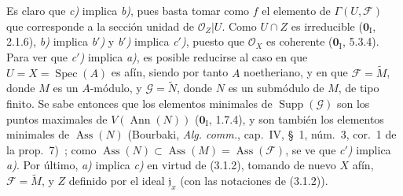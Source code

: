 Es claro que \emph{c)} implica \emph{b)}, pues basta tomar como $f$ el elemento
de $\Gamma(U,\mathcal F)$ que corresponde a la sección unidad de
$\mathcal O_Z|U$. Como $U\cap Z$ es irreducible ($\mathbf{0}_{\mathrm I}$, 2.1.6),
\emph{b)} implica \emph{b$'$)} y \emph{b$'$)} implica \emph{c$'$)}, puesto que
$\mathcal O_X$ es coherente ($\mathbf{0}_{\mathrm I}$, 5.3.4). Para ver que
\emph{c$'$)} implica \emph{a)}, es posible reducirse al caso en que
$U=X=\operatorname{Spec}(A)$ es afín, siendo por tanto $A$ noetheriano, y en
que $\mathcal F=\widetilde M$, donde $M$ es un $A$-módulo, y
$\mathcal G=\widetilde N$, donde $N$ es un submódulo de $M$, de tipo finito.
Se sabe entonces que los elementos minimales de
$\operatorname{Supp}(\mathcal G)$ son los puntos maximales de
$V(\operatorname{Ann}(N))$ ($\mathbf{0}_{\mathrm I}$, 1.7.4), y son también los elementos
minimales de $\operatorname{Ass}(N)$ (Bourbaki, \emph{Alg. comm.}, cap.~IV,
\S~1, núm.~3, cor.~1 de la prop.~7)~; como
$\operatorname{Ass}(N)\subset\operatorname{Ass}(M)
=\operatorname{Ass}(\mathcal F)$, se ve que \emph{c$'$)} implica
\emph{a)}. Por último, \emph{a)} implica \emph{c)} en virtud de (3.1.2),
tomando de nuevo $X$ afín, $\mathcal F=\widetilde M$, y $Z$ definido por el
ideal $\mathfrak j_x$ (con las notaciones de (3.1.2)).

